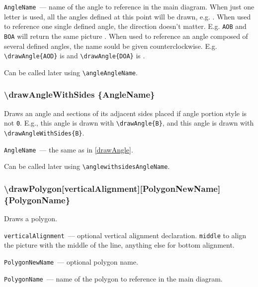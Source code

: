 	\texttt{AngleName}~— name of the angle to reference in the main diagram. 
	When just one letter is used, all the angles defined at this point will be drawn, e.g. . When used to reference one single defined angle, the direction doesn't matter. 
	E.g. \texttt{AOB} and \texttt{BOA} will return the same picture . 
	When used to reference an angle composed of several defined angles, the name sould be given counterclockwise. 
	E.g. \texttt{\textbackslash drawAngle\{AOD\}} is  and \texttt{\textbackslash drawAngle\{DOA\}} is .
	
	Can be called later using \texttt{\textbackslash angleAngleName}.
	
\subsubsection{\textbackslash drawAngleWithSides \{AngleName\}}


	Draws an angle and sections of its adjacent sides placed if angle portion style is not \texttt{0}. E.g., this angle  is drawn with \texttt{\textbackslash drawAngle\{B\}}, and this angle  is drawn with \texttt{\textbackslash drawAngleWithSides\{B\}}. 

	\texttt{AngleName}~— the same as in \ref{drawAngle}.
	
	Can be called later using \texttt{\textbackslash anglewithsidesAngleName}.
	
\subsubsection{\textbackslash drawPolygon[verticalAlignment][PolygonNewName] \{Poly\-gon\-Na\-me\}}

	Draws a polygon.

	\texttt{verticalAlignment}~— optional vertical alignment declaration. \texttt{middle} to align the picture with the middle of the line, anything else for bottom alignment.

	\texttt{PolygonNewName}~— optional polygon name. 
	
	\texttt{PolygonName}~— name of the polygon to reference in the main diagram. 
	
